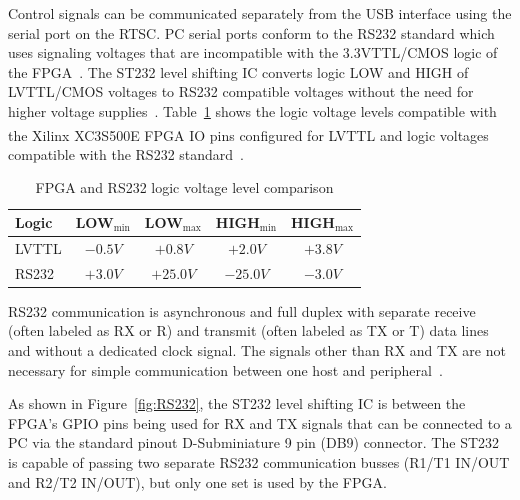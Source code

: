 Control signals can be communicated separately from the USB interface using the serial port on the RTSC.  PC serial ports conform to the RS232 standard which uses signaling voltages that are incompatible with the 3.3VTTL/CMOS logic of the FPGA~\cite{StrangioRS232}.  The ST232 level shifting IC converts logic LOW and HIGH of LVTTL/CMOS voltages to RS232 compatible voltages without the need for higher voltage supplies~\cite{ST232ds}.  Table~\ref{tab:RS232TTL} shows the logic voltage levels compatible with the Xilinx\textsuperscript{\textregistered} XC3S500E FPGA IO pins configured for LVTTL and logic voltages compatible with the RS232 standard~\cite{Spartan3eDS,StrangioRS232}.

\renewcommand{\arraystretch}{1.3}
\begin{table}[h]
\centering 
  \begin{tabular}{| l | c | c | c | c |}
    \hline
    Logic & LOW$_{\mathrm{min}}$ & LOW$_{\mathrm{max}}$ & HIGH$_{\mathrm{min}}$ & HIGH$_{\mathrm{max}}$ \\
	\hline
    LVTTL & $-0.5\unit{V}$ & $+0.8\unit{V}$ & $+2.0\unit{V}$ & $+3.8\unit{V}$ \\
	\hline
    RS232 & $+3.0\unit{V}$ & $+25.0\unit{V}$ & $-25.0\unit{V}$  & $-3.0\unit{V}$ \\
    \hline
  \end{tabular}
  \caption{FPGA and RS232 logic voltage level comparison\label{tab:RS232TTL} }

\end{table}
\renewcommand{\arraystretch}{1.0}

RS232 communication is asynchronous and full duplex with separate receive (often labeled as RX or R) and transmit (often labeled as TX or T) data lines and without a dedicated clock signal.  The signals other than RX and TX are not necessary for simple communication between one host and peripheral~\cite{StrangioRS232}.

As shown in Figure~\ref{fig:RS232}, the ST232 level shifting IC is between the FPGA's GPIO pins being used for RX and TX signals that can be connected to a PC via the standard pinout D-Subminiature 9 pin (DB9) connector.  The ST232 is capable of passing two separate RS232 communication busses (R1/T1 IN/OUT and R2/T2 IN/OUT), but only one set is used by the FPGA.

